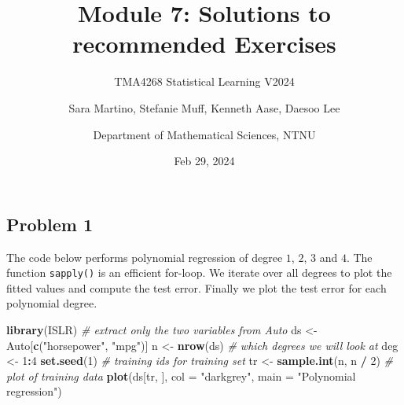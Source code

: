 \documentclass[
]{article}
\title{Module 7: Solutions to recommended Exercises}
\subtitle{TMA4268 Statistical Learning V2024}
\author{Sara Martino, Stefanie Muff, Kenneth Aase, Daesoo
Lee \and Department of Mathematical Sciences, NTNU}
\date{Feb 29, 2024}
\newenvironment{Shaded}{\begin{snugshade}}{\end{snugshade}}
\newcommand{\AttributeTok}[1]{\textcolor[rgb]{0.13,0.29,0.53}{#1}}
\newcommand{\CommentTok}[1]{\textcolor[rgb]{0.56,0.35,0.01}{\textit{#1}}}
\newcommand{\DecValTok}[1]{\textcolor[rgb]{0.00,0.00,0.81}{#1}}
\newcommand{\FunctionTok}[1]{\textcolor[rgb]{0.13,0.29,0.53}{\textbf{#1}}}
\newcommand{\NormalTok}[1]{#1}
\newcommand{\OtherTok}[1]{\textcolor[rgb]{0.56,0.35,0.01}{#1}}
\newcommand{\SpecialCharTok}[1]{\textcolor[rgb]{0.81,0.36,0.00}{\textbf{#1}}}
\newcommand{\StringTok}[1]{\textcolor[rgb]{0.31,0.60,0.02}{#1}}
\begin{document}
\maketitle

\hypertarget{problem-1}{%
\subsection{Problem 1}\label{problem-1}}

The code below performs polynomial regression of degree \(1\), \(2\),
\(3\) and \(4\). The function \texttt{sapply()} is an efficient
for-loop. We iterate over all degrees to plot the fitted values and
compute the test error. Finally we plot the test error for each
polynomial degree.

\begin{Shaded}
\begin{Highlighting}[]
\FunctionTok{library}\NormalTok{(ISLR)}
\CommentTok{\# extract only the two variables from Auto}
\NormalTok{ds }\OtherTok{\textless{}{-}}\NormalTok{ Auto[}\FunctionTok{c}\NormalTok{(}\StringTok{"horsepower"}\NormalTok{, }\StringTok{"mpg"}\NormalTok{)]}
\NormalTok{n }\OtherTok{\textless{}{-}} \FunctionTok{nrow}\NormalTok{(ds)}
\CommentTok{\# which degrees we will look at}
\NormalTok{deg }\OtherTok{\textless{}{-}} \DecValTok{1}\SpecialCharTok{:}\DecValTok{4}
\FunctionTok{set.seed}\NormalTok{(}\DecValTok{1}\NormalTok{)}
\CommentTok{\# training ids for training set}
\NormalTok{tr }\OtherTok{\textless{}{-}} \FunctionTok{sample.int}\NormalTok{(n, n }\SpecialCharTok{/} \DecValTok{2}\NormalTok{)}
\CommentTok{\# plot of training data}
\FunctionTok{plot}\NormalTok{(ds[tr, ], }\AttributeTok{col =} \StringTok{"darkgrey"}\NormalTok{, }\AttributeTok{main =} \StringTok{"Polynomial regression"}\NormalTok{)}


\end{Highlighting}
\end{Shaded}
\end{document}
